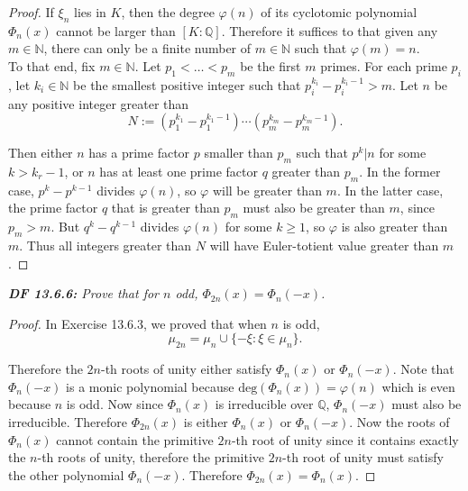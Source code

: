 \documentclass{article}
\begin{document}
  \begin{proof}
    If $\xi_n$ lies in $K$, then the degree $\varphi(n)$ of its cyclotomic
    polynomial $\Phi_n(x)$ cannot be larger than $[K:\mathbb{Q}]$.
    Therefore it suffices to that given any $m\in\mathbb{N}$, there can
    only be a finite number of $m\in\mathbb{N}$ such that $\varphi(m)=n$.
    \\

    To that end, fix $m\in\mathbb{N}$. Let $p_1<\ldots<p_m$ be the
    first $m$ primes. For each prime $p_i$, let $k_i\in\mathbb{N}$ be the
    smallest positive integer such that $p_i^{k_i}-p_i^{k_i-1}>m$. Let $n$
    be any positive integer greater than
    \[N:=(p_1^{k_1}-p_1^{k_1-1}) \cdots (p_m^{k_m}-p_m^{k_m-1}).\]

    Then either $n$ has a prime factor $p$ smaller than $p_m$ such that
    $p^{k}|n$ for some $k>k_r-1$, or $n$ has at least one prime factor $q$
    greater than $p_m$. In the former case, $p^k-p^{k-1}$ divides
    $\varphi(n)$, so $\varphi$ will be greater than $m$. In the latter
    case, the prime factor $q$ that is greater than $p_m$ must also be
    greater than $m$, since $p_m>m$. But $q^k-q^{k-1}$ divides $\varphi(n)$
    for some $k\geq1$, so $\varphi$ is also greater than $m$. Thus all
    integers greater than $N$ will have Euler-totient value greater than
    $m$.
  \end{proof}

\it \textbf{DF 13.6.6:} Prove that for $n$ odd, $\Phi_{2n}(x)=\Phi_n(-x)$.
  \begin{proof}
    In Exercise 13.6.3, we proved that when $n$ is odd,
    \[\mu_{2n} =\mu_n \cup \{-\xi:\xi\in\mu_n\}.\]

    Therefore the $2n$-th roots of unity either satisfy $\Phi_n(x)$ or
    $\Phi_n(-x)$. Note that $\Phi_n(-x)$ is a monic polynomial because
    $\text{deg}(\Phi_n(x)) =\varphi(n)$ which is even because $n$ is odd.
    Now since $\Phi_n(x)$ is irreducible over $\mathbb{Q}$, $\Phi_n(-x)$
    must also be irreducible. Therefore $\Phi_{2n}(x)$ is either
    $\Phi_n(x)$ or $\Phi_n(-x)$. Now the roots of $\Phi_n(x)$ cannot
    contain the primitive $2n$-th root of unity since it contains exactly
    the $n$-th roots of unity, therefore the primitive $2n$-th root of
    unity must satisfy the other polynomial $\Phi_n(-x)$. Therefore
    $\Phi_{2n}(x)=\Phi_n(x)$.
  \end{proof}
\end{document}
